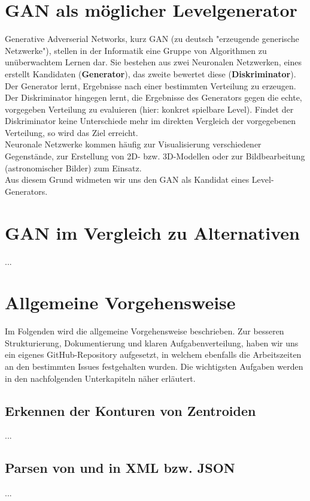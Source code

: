 \documentclass[11pt]{article}
\begin{document}
\section{GAN als möglicher Levelgenerator}
Generative Adverserial Networks, kurz GAN (zu deutsch "erzeugende generische Netzwerke"), stellen in der Informatik eine Gruppe von Algorithmen zu unüberwachtem Lernen dar. Sie bestehen aus zwei Neuronalen Netzwerken, eines erstellt Kandidaten (\textbf{Generator}), das zweite bewertet diese (\textbf{Diskriminator}).\\Der Generator lernt, Ergebnisse nach einer bestimmten Verteilung zu erzeugen. Der Diskriminator hingegen lernt, die Ergebnisse des Generators gegen die echte, vorgegeben Verteilung zu evaluieren (hier: konkret spielbare Level). Findet der Diskriminator keine Unterschiede mehr im direkten Vergleich der vorgegebenen Verteilung, so wird das Ziel erreicht.\\Neuronale Netzwerke kommen häufig zur Visualisierung verschiedener Gegenstände, zur Erstellung von 2D- bzw. 3D-Modellen oder zur Bildbearbeitung (astronomischer Bilder) zum Einsatz.\\Aus diesem Grund widmeten wir uns den GAN als Kandidat eines Level-Generators.
\section{GAN im Vergleich zu Alternativen}
...
\section{Allgemeine Vorgehensweise}
Im Folgenden wird die allgemeine Vorgehensweise beschrieben. Zur besseren Strukturierung, Dokumentierung und klaren Aufgabenverteilung, haben wir uns ein eigenes GitHub-Repository aufgesetzt, in welchem ebenfalls die Arbeitszeiten an den bestimmten Issues festgehalten wurden. Die wichtigsten Aufgaben werden in den nachfolgenden Unterkapiteln näher erläutert.
\subsection{Erkennen der  Konturen von Zentroiden}
...
\subsection{Parsen von und in XML bzw. JSON}
...
\end{document}

